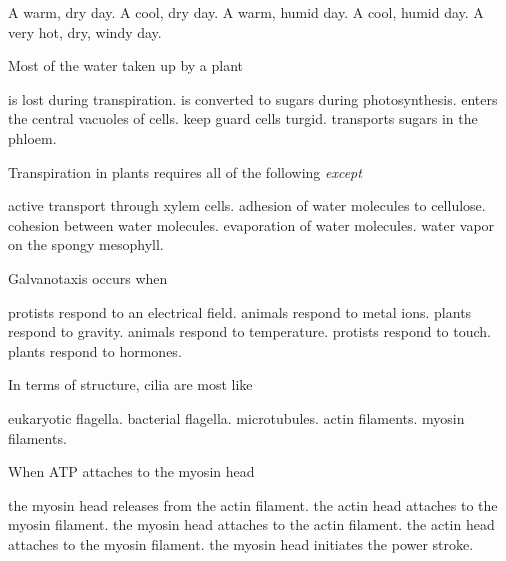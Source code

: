 \begin{choices}
\correctchoice A warm, dry day. %
\choice A cool, dry day. %
\choice A warm, humid day.  %
\choice A cool, humid day. %
\choice A very hot, dry, windy day. %
\end{choices}

\question
Most of the water taken up by a plant

\begin{choices}
\correctchoice is lost during transpiration. %
\choice is converted to sugars during photosynthesis. %
\choice enters the central vacuoles of cells.  %
\choice keep guard cells turgid. %
\choice transports sugars in the phloem. %
\end{choices}

\question
Transpiration in plants requires all of the following \emph{except}

\begin{choices}
\correctchoice active transport through xylem cells. %
\choice adhesion of water molecules to cellulose. %
\choice cohesion between water molecules.  %
\choice evaporation of water molecules. %
\choice water vapor on the spongy mesophyll. %
\end{choices}


\question
Galvanotaxis occurs when 

\begin{choices}
\correctchoice protists respond to an electrical field. %
\choice animals respond to metal ions. %
\choice plants respond to gravity.  %
\choice animals respond to temperature. %
\choice protists respond to touch. %
\choice plants respond to hormones. %
\end{choices}


\question
In terms of structure, cilia  are most like 
\begin{choices}
\correctchoice eukaryotic flagella. %
\choice bacterial flagella. %
\choice microtubules.  %
\choice actin filaments. %
\choice myosin filaments. %
\end{choices}

\question
When ATP attaches to the myosin head

\begin{choices}
\correctchoice the myosin head releases from the actin filament. %
\choice the actin head attaches to the myosin filament. %
\choice the myosin head attaches to the actin filament.  %
\choice the actin head attaches to the myosin filament. %
\choice the myosin head initiates the power stroke. %
\end{choices}

